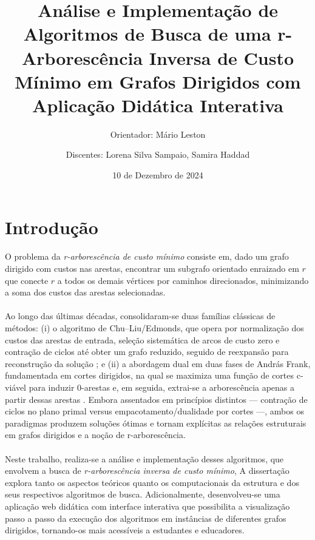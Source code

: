 \documentclass[12pt,a4paper]{article}
\title{Análise e Implementação de Algoritmos de Busca de uma r-Arborescência Inversa de Custo Mínimo em Grafos Dirigidos com Aplicação Didática Interativa}
\author{Orientador: Mário Leston 
\and Discentes: Lorena Silva Sampaio, Samira Haddad}
\date{10 de Dezembro de 2024}
\begin{document}
\maketitle

\section{Introdução}

\paragraph{}
O problema da \textit{r-arborescência de custo mínimo} consiste em, dado um grafo dirigido com custos nas arestas, encontrar um subgrafo orientado enraizado em \(r\) que conecte \(r\) a todos os demais vértices por caminhos direcionados, minimizando a soma dos custos das arestas selecionadas.  

\paragraph{}
Ao longo das últimas décadas, consolidaram-se duas famílias clássicas de métodos: (i) o algoritmo de Chu--Liu/Edmonds, que opera por normalização dos custos das arestas de entrada, seleção sistemática de arcos de custo zero e contração de ciclos até obter um grafo reduzido, seguido de reexpansão para reconstrução da solução \cite{chu1965,edmonds1967optimum}; e (ii) a abordagem dual em duas fases de András Frank, fundamentada em cortes dirigidos, na qual se maximiza uma função de cortes c-viável para induzir 0-arestas e, em seguida, extrai-se a arborescência apenas a partir dessas arestas \cite{frank2014}. Embora assentados em princípios distintos — contração de ciclos no plano primal versus empacotamento/dualidade por cortes —, ambos os paradigmas produzem soluções ótimas e tornam explícitas as relações estruturais em grafos dirigidos e a noção de r-arborescência.  

\paragraph{}
Neste trabalho, realiza-se a análise e implementação desses algoritmos, 
que envolvem a busca de \textit{r-arborescência inversa de custo mínimo}, 
A dissertação explora tanto os aspectos teóricos quanto os computacionais 
da estrutura e dos seus respectivos algoritmos de busca.
Adicionalmente, desenvolveu-se uma aplicação web didática com interface interativa que possibilita a visualização passo a passo da execução dos algoritmos em instâncias de diferentes grafos dirigidos, tornando-os mais acessíveis a estudantes e educadores.  
\end{document}
